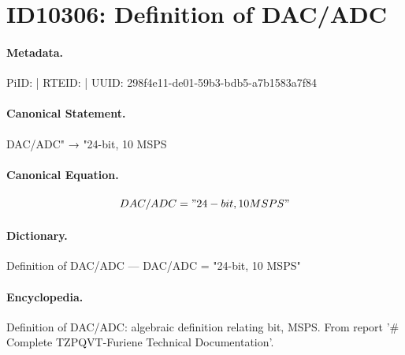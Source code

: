 \section*{ID10306: Definition of DAC/ADC}
\paragraph{Metadata.}
PiID:  | RTEID:  | UUID: 298f4e11-de01-59b3-bdb5-a7b1583a7f84

\paragraph{Canonical Statement.}
DAC/ADC" → "24-bit, 10 MSPS

\paragraph{Canonical Equation.}
\[
DAC/ADC = "24-bit, 10 MSPS"
\]

\paragraph{Dictionary.}
Definition of DAC/ADC — DAC/ADC = "24-bit, 10 MSPS"

\paragraph{Encyclopedia.}
Definition of DAC/ADC: algebraic definition relating bit, MSPS. From report '\# Complete TZPQVT-Furiene Technical Documentation'.
